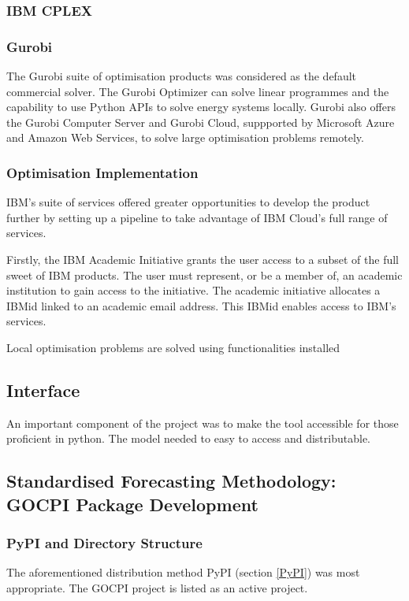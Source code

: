 \documentclass[12pt]{article}
\begin{document}
\subsubsection{IBM CPLEX}

\subsubsection{Gurobi}
The Gurobi suite of optimisation products
was considered as the default commercial solver. The Gurobi Optimizer can solve linear programmes
and the capability to use Python APIs to solve energy systems locally. 
Gurobi also offers the Gurobi Computer Server and Gurobi Cloud, suppported by Microsoft Azure and Amazon Web Services, to solve large optimisation problems remotely.

\subsubsection{Optimisation Implementation}
IBM's suite of services offered greater opportunities to develop the product further
by setting up a pipeline to take advantage of IBM Cloud's full range of services.

Firstly, the IBM Academic Initiative grants the user access to a subset of the full sweet of IBM products.
The user must represent, or be a member of, an academic institution to gain access to the initiative.
The academic initiative allocates a IBMid linked to an academic email address. 
This IBMid enables access to IBM's services.

Local optimisation problems are solved using functionalities installed




\subsection{Interface}
An important component of the project was to make the tool accessible for those proficient in python.
The model needed to easy to access and distributable.

\subsection{Standardised Forecasting Methodology: GOCPI Package Development}

\subsubsection{PyPI and Directory Structure}
The aforementioned distribution method PyPI (section \ref{PyPI}) was most appropriate.
The GOCPI project is listed as an active project.
\end{document}
